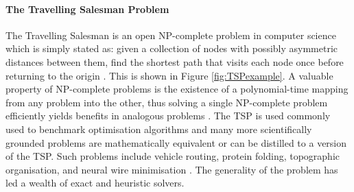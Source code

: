 \paragraph{The Travelling Salesman Problem}
The Travelling Salesman is an open NP-complete problem in computer science which is simply stated as: given a collection of nodes with possibly asymmetric distances between them, find the shortest path that visits each node once before returning to the origin \cite{Applegate2007-nz}. This is shown in Figure \ref{fig:TSPexample}. A valuable property of NP-complete problems is the existence of a polynomial-time mapping from any problem into the other, thus solving a single NP-complete problem efficiently yields benefits in analogous problems \cite{Garey1990-th}. The TSP is used commonly used to benchmark optimisation algorithms and many more scientifically grounded problems are mathematically equivalent or can be distilled to a version of the TSP. Such problems include vehicle routing, protein folding, topographic organisation, and neural wire minimisation \cite{Ball2002-hf, Guo2007-ub, PaoloToth2002Tvrp, Durbin1990-tn}. The generality of the problem has led a wealth of exact and heuristic solvers.
